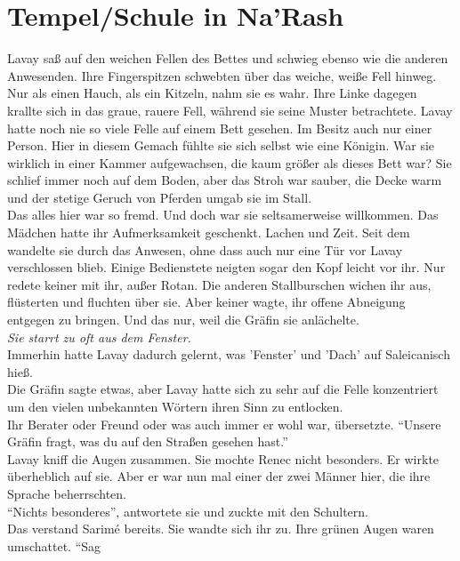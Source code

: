 \chapter{Tempel/Schule in Na'Rash}

Lavay saß auf den weichen Fellen des Bettes und schwieg ebenso wie die anderen Anwesenden. Ihre 
Fingerspitzen schwebten über das weiche, weiße Fell hinweg. Nur als einen Hauch, als ein Kitzeln, 
nahm sie es wahr. Ihre Linke dagegen krallte sich in das graue, rauere Fell, während sie seine 
Muster betrachtete. Lavay hatte noch nie so viele Felle auf einem Bett gesehen. Im Besitz auch nur 
einer Person. Hier in diesem Gemach fühlte sie sich selbst wie eine Königin. War sie wirklich in 
einer Kammer aufgewachsen, die kaum größer als dieses Bett war? Sie schlief immer noch auf dem 
Boden, aber das Stroh war sauber, die Decke warm und der stetige Geruch von Pferden umgab sie im 
Stall.\\
Das alles hier war so fremd. Und doch war sie seltsamerweise willkommen. Das Mädchen hatte ihr 
Aufmerksamkeit geschenkt. Lachen und Zeit. Seit dem wandelte sie durch das Anwesen, ohne dass auch 
nur eine Tür vor Lavay verschlossen blieb. Einige Bedienstete neigten sogar den Kopf leicht vor 
ihr. Nur redete keiner mit ihr, außer Rotan. Die anderen Stallburschen wichen ihr aus, flüsterten 
und fluchten über sie. Aber keiner wagte, ihr offene Abneigung entgegen zu bringen. Und das nur, 
weil die Gräfin sie anlächelte.\\                                          
\textit{Sie starrt zu oft aus dem Fenster.}\\
Immerhin hatte Lavay dadurch gelernt, was 'Fenster' und 'Dach' auf Saleicanisch hieß.\\
Die Gräfin sagte etwas, aber Lavay hatte sich zu sehr auf die Felle konzentriert um den vielen 
unbekannten Wörtern ihren Sinn zu entlocken.\\                                                   
Ihr Berater oder Freund oder was auch immer er wohl war, übersetzte. ``Unsere Gräfin fragt, was du 
auf den Straßen gesehen hast.''\\
Lavay kniff die Augen zusammen. Sie mochte Renec nicht besonders. Er wirkte überheblich auf sie. 
Aber er war nun mal einer der zwei Männer hier, die ihre Sprache beherrschten.\\
``Nichts besonderes'', antwortete sie und zuckte mit den Schultern.\\
Das verstand Sarimé bereits. Sie wandte sich ihr zu. Ihre grünen Augen waren umschattet. ``Sag 
